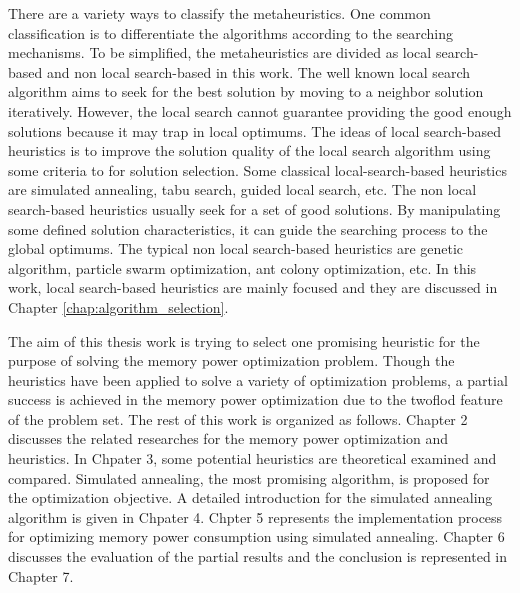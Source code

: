 	There are a variety ways to classify the metaheuristics. One common classification is to differentiate the algorithms
	according to the searching mechanisms. To be simplified, the metaheuristics are divided as local search-based and
	non local search-based in this work. The well known local search algorithm aims to seek for the best solution by
	moving to a neighbor solution iteratively. However, the local search cannot guarantee providing the good enough solutions
	because it may trap in local optimums. The ideas of local search-based heuristics is to improve the solution quality
	of the local search algorithm using some criteria to for solution selection. Some classical local-search-based heuristics are
	simulated annealing, tabu search, guided local search, etc. The non local search-based heuristics usually seek for a set
	of good solutions. By manipulating some defined solution characteristics, it can guide the searching process to the global optimums.
	The typical non local search-based heuristics are genetic algorithm, particle swarm optimization, ant colony optimization, etc.
	In this work, local search-based heuristics are mainly focused and they are discussed in Chapter \ref{chap:algorithm_selection}.
	
	The aim of this thesis work is trying to select one promising heuristic for the purpose of solving the memory power optimization problem. Though the heuristics have been applied to solve a variety of optimization problems, a partial success is achieved in the
	memory power optimization due to the twoflod feature of the problem set. The rest of this work is organized as follows.
	Chapter 2 discusses the related researches for the memory power optimization and heuristics. In Chpater 3, some potential
	heuristics are theoretical examined and compared. Simulated annealing, the most promising algorithm, is proposed for the 
	optimization objective. A detailed introduction for the simulated annealing algorithm is given in Chpater 4. Chpter 5 represents
	the implementation process for optimizing memory power consumption using simulated annealing. Chapter 6 discusses the evaluation
	of the partial results and the conclusion is represented in Chapter 7.


